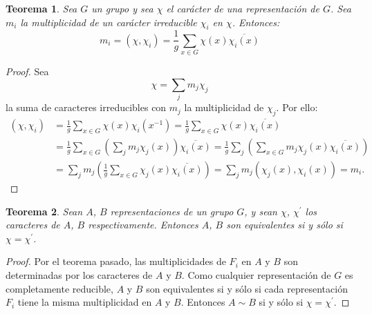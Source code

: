 \documentclass[12pt]{book}
\newtheorem{theorem}{Teorema}[section]
\theoremstyle{definition}
\newcounter{in}
\begin{document}
\begin{theorem}
  \label{t4_5}
  Sea $G$ un grupo y sea $\chi$ el carácter de una
  representación de $G$. Sea $m_{i}$ la multiplicidad de un carácter
  irreducible $\chi_{i}$ en $\chi$. Entonces:
  \begin{equation*}
    m_{i} = (\chi,\chi_{i}) = \frac{1}{g} \sum_{x \in G} \chi(x) \overline{\chi_{i}(x)}
  \end{equation*}

\end{theorem}
\begin{proof}
  Sea $$\chi=\sum_{j} m_{j} \chi_{j}$$ la suma de caracteres
  irreducibles con $m_{j}$ la multiplicidad de $\chi_{j}$. Por ello:
  \begin{equation}
  \begin{aligned}
    \label{eq:38}
    (\chi,\chi_{i}) & = \frac{1}{g} \sum_{x \in G} \chi(x) \chi_{i}(x^{-1})  = \frac{1}{g} \sum_{x \in G} \chi(x) \overline{\chi_{i}(x)} \\
    & = \frac{1}{g} \sum_{x \in G} (\sum_{j} m_{j}  \chi_{j}(x)) \overline{\chi_{i}(x)} = \frac{1}{g} \sum_{j} (\sum_{x \in G} m_{j}  \chi_{j}(x) \overline{\chi_{i}(x)}) \\
    & = \sum_{j} m_{j} ( \frac{1}{g} \sum_{x \in G} \chi_{j}(x) \overline{\chi_{i}(x)}) = \sum_{j} m_{j} (\chi_{j}(x), \chi_{i}(x)) = m_{i}.  
\end{aligned}  
  \end{equation}
\end{proof}

\begin{theorem}
  \label{t4_6}
  Sean $A$, $B$ representaciones de un grupo $G$, y sean $\chi$,
  $\chi^{'}$ los caracteres de $A$, $B$ respectivamente. Entonces $A$,
  $B$ son equivalentes si y sólo si $\chi=\chi^{'}$.
\end{theorem}

\begin{proof}
  Por el teorema pasado, las multiplicidades de $F_{i}$ en $A$ y $B$
  son determinadas por los caracteres de $A$ y $B$. Como cualquier
  representación de $G$ es completamente reducible, $A$ y $B$ son
  equivalentes si y sólo si cada representación $F_{i}$ tiene la misma
  multiplicidad en $A$ y $B$. Entonces $A \sim B$ si y sólo si $\chi=\chi^{'}$.
\end{proof}
\end{document}

